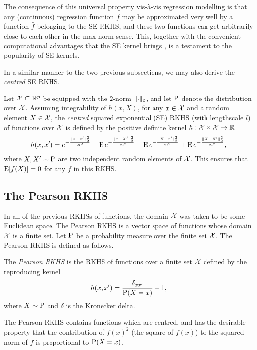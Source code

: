The consequence of this universal property vis-à-vis regression modelling is that any (continuous) regression function $f$ may be approximated very well by a function $\hat f$ belonging to the SE RKHS, and these two functions can get arbitrarily close to each other in the max norm sense.
This, together with the convenient computational advantages that the SE kernel brings \citep{raykar2007fast}, is a testament to the popularity of SE kernels.

In a similar manner to the two previous subsections, we may also derive the \emph{centred} SE RKHS. 

\begin{definition}
  Let ${\mathcal X} \subseteq \mathbb{R}^p$ be equipped with the 2-norm $\lVert\cdot\rVert_2$, and let $\operatorname{P}$ denote the distribution over ${\mathcal X}$.
  Assuming integrability of $h(x,X)$, for any $x\in{\mathcal X}$ and a random element $X\in{\mathcal X}$, the \emph{centred} squared exponential (SE) RKHS (with lengthscale $l$) of functions over ${\mathcal X}$ is defined by the positive definite kernel $h:{\mathcal X}\times{\mathcal X}\to\mathbb{R}$ 
  \[
    h(x,x') = e^{-\frac{\lVert x-x'\rVert_2^2}{2l^2}} 
    - \operatorname{E} e^{-\frac{\lVert x-X'\rVert_2^2}{2l^2}} 
    - \operatorname{E} e^{-\frac{\lVert X-x'\rVert_2^2}{2l^2}} 
    + \operatorname{E} e^{-\frac{\lVert X-X'\rVert_2^2}{2l^2}},
  \]
  where $X,X'\sim\operatorname{P}$ are two independent random elements of ${\mathcal X}$. 
  This ensures that $\operatorname{E}[ f(X) ] = 0$ for any $f$ in this RKHS.
\end{definition}

\subsection{The Pearson RKHS}

In all of the previous RKHSs of functions, the domain ${\mathcal X}$ was taken to be some Euclidean space. 
The Pearson RKHS is a vector space of functions whose domain ${\mathcal X}$ is a finite set.
Let $\operatorname{P}$ be a probability measure over the finite set ${\mathcal X}$. 
The Pearson RKHS is defined as follows.

\begin{definition}\label{def:pearson}
  The \emph{Pearson RKHS} is the RKHS of functions over a finite set ${\mathcal X}$ defined by the reproducing kernel
  \[
    h(x,x') = \frac{\delta_{xx'}}{\operatorname{P}(X=x)} - 1,
  \]
  where $X \sim \operatorname{P}$ and $\delta$ is the Kronecker delta.
\end{definition}

The Pearson RKHS contains functions which are centred, and has the desirable property that the contribution of $f(x)^2$ (the square of $f(x)$) to the squared norm of $f$ is proportional to $\operatorname{P}(X=x)$.

